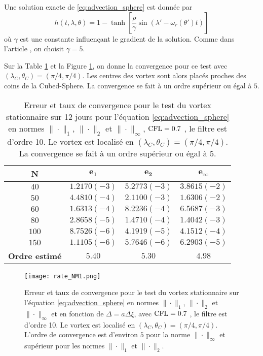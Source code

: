 Une solution exacte de \eqref{eq:advection_sphere} est donnée par
\begin{equation}
h(t, \lambda, \theta) = 1 - \tanh \left[ \dfrac{\rho}{\gamma} \sin (\lambda' - \omega_r (\theta') t) \right]
\label{eq:NM_solexacte}
\end{equation}
où $\gamma$ est une constante influençant le gradient de la solution. Comme dans l'article \cite{Nair2002}, on choisit $\gamma = 5$.

Sur la Table \ref{tab:rate1_NM} et la Figure \ref{fig:rate1_NM}, on donne la convergence pour ce test avec $(\lambda_C, \theta_C)=(\pi /4 , \pi /4)$. Les centres des vortex sont alors placés proches des coins de la Cubed-Sphere. La convergence se fait à un ordre supérieur ou égal à $5$.

\begin{table}[htbp]
\begin{center}
\begin{tabular}{|c||c|c|c|}
\hline
\textbf{N}  & $\mathbf{e_1}$ & $\mathbf{e_2}$ & $\mathbf{e_{\infty}}$\\
\hline
\hline
$40$  & $1.2170 (-3)$ & $5.2773 (-3)$ & $3.8615 (-2)$ \\
$50$  & $4.4810 (-4)$ & $2.1100 (-3)$ & $1.6306 (-2)$ \\
$60$  & $1.6313 (-4)$ & $8.2236 (-4)$ & $6.5687 (-3)$ \\
$80$  & $2.8658 (-5)$ & $1.4710 (-4)$ & $1.4042 (-3)$ \\
$100$  & $8.7526 (-6)$ & $4.1919 (-5)$ & $4.1512 (-4)$ \\
$150$  & $1.1105 (-6)$ & $5.7646 (-6)$ & $6.2903 (-5)$ \\
\hline 
\hline
\textbf{Ordre estimé}& $5.40$ & $5.30$ & $4.98$\\
\hline
\end{tabular}
\end{center}
\caption{Erreur et taux de convergence pour le test du vortex stationnaire sur 12 jours pour l'équation \eqref{eq:advection_sphere} en normes $\| \cdot\|_1$, $\| \cdot\|_2$ et $\| \cdot\|_{\infty}$, $\text{CFL} = 0.7$ \cite{Nair2002}, le filtre est d'ordre 10. Le vortex est localisé en $(\lambda_C, \theta_C)=(\pi /4 , \pi /4)$. La convergence se fait à un ordre supérieur ou égal à $5$.}
\label{tab:rate1_NM}
\end{table} 

\begin{figure}[htbp]
\begin{center}
\texttt{[image: rate\_NM1.png]}
\end{center}
\caption{Erreur et taux de convergence pour le test du vortex stationnaire sur l'équation \eqref{eq:advection_sphere} en normes $\| \cdot\|_1$, $\| \cdot\|_2$ et $\| \cdot\|_{\infty}$ et en fonction de $\Delta = a \Delta \xi$, avec $\text{CFL} = 0.7$ \cite{Nair2002}, le filtre est d'ordre 10. Le vortex est localisé en $(\lambda_C, \theta_C)=(\pi /4 , \pi /4)$. L'ordre de convergence est d'environ $5$ pour la norme $\| \cdot \|_{\infty}$ et supérieur pour les normes $\| \cdot \|_{1}$ et $\| \cdot \|_{2}$.}
\label{fig:rate1_NM}
\end{figure} 

